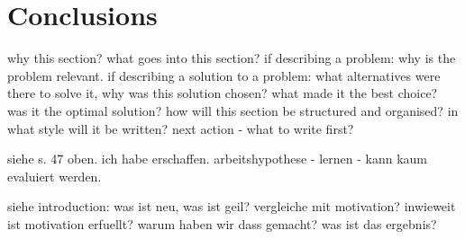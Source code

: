 \chapter{Conclusions}

why this section? 
what goes into this section?
  if describing a problem: why is the problem relevant.
  if describing a solution to a problem: what alternatives were
  there to solve it, why was this solution chosen? what made it the best
  choice? was it the optimal solution?
how will this section be structured and organised?
in what style will it be written?
next action - what to write first?



siehe s. 47 oben.
ich habe erschaffen.
arbeitshypothese - lernen - kann kaum evaluiert werden.

siehe introduction:
was ist neu, was ist geil?
vergleiche mit motivation?
inwieweit ist motivation erfuellt?
warum haben wir dass gemacht? was ist das ergebnis?
